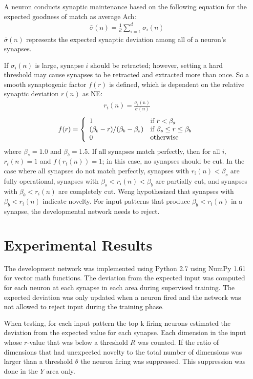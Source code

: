 \documentclass[conference]{IEEEtran}
\begin{document}
A neuron conducts synaptic maintenance based on the following equation for the expected goodness of match
as average Ach:
\begin{align}\bar{\sigma}(n)=\frac{1}{d}\sum_{i=1}^d\sigma_i(n)\end{align}
$\bar{\sigma}(n)$ represents the expected synaptic deviation among all of a neuron's synapses.

If $\sigma_i(n)$ is large, synapse $i$ should be retracted; however, setting a hard threshold may cause synapses to be retracted and extracted more than once. So a smooth synaptogenic factor $f(r)$ is defined, which is dependent on the relative synaptic deviation $r(n)$ as NE:
\begin{align}r_i(n)=\frac{\sigma_i(n)}{\bar{\sigma}(n)}\end{align}
\begin{align}
f(r)=\left\{
\begin{array}{l l}
1 & \text{if $r < \beta_s$} \\
(\beta_b-r)/(\beta_b-\beta_s) & \text{if $\beta_s \le r \le \beta_b$} \\
0 & \text{otherwise}
\end{array}\right.\end{align}
where $\beta_s=1.0$ and $\beta_b=1.5$. If all synapses match perfectly, then for all $i$, $r_i(n)=1$ and $f(r_i(n))=1$; in this case, no synapses should be cut. In the case where all synapses do not match perfectly, synapses with $r_i(n) < \beta_s$ are fully operational, synapses with $\beta_s < r_i(n) < \beta_b$ are partially cut, and synapses with $\beta_b < r_i(n)$ are completely cut. Weng \cite{WengNAI12} hypothesized that synapses with $\beta_b < r_i(n)$ indicate novelty. For input patterns that produce $\beta_b < r_i(n)$ in a synapse, the developmental network needs to reject.

\section{Experimental Results}

The development network was implemented using Python 2.7 using NumPy 1.61 for vector math functions.  The deviation from the expected input was computed for each neuron at each synapse in each area during supervised training.  The expected deviation was only updated when a neuron fired and the network was not allowed to reject input during the training phase.

When testing, for each input pattern the top k firing neurons estimated the deviation from the expected value for each synapse.  Each dimension in the input whose $r$-value that was below a threshold $R$ was counted.  If the ratio of dimensions that had unexpected novelty to the total number of dimensions was larger than a threshold $\theta$ the neuron firing was suppressed.  This suppression was done in the $Y$ area only.
\end{document}
